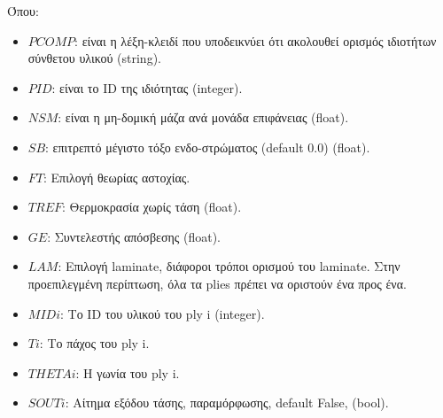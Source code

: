 \begin{table}[h]
  \centering
  \caption{H \textlatin{bulk data entry} κάρτα \textlatin{PCOMP} του \textlatin{Optistruct}}
  \label{tab:OptistructPCOMPcard}
\end{table}


Όπου:

\begin{itemize}
  \item
    $PCOMP$: είναι η λέξη-κλειδί που υποδεικνύει ότι ακολουθεί ορισμός ιδιοτήτων σύνθετου υλικού \textlatin{(string)}.
  \item
    $PID$: είναι το ID της ιδιότητας \textlatin{(integer)}.
  \item
    $NSM$: είναι η μη-δομική μάζα ανά μονάδα επιφάνειας \textlatin{(float)}.
  \item
    $SB$: επιτρεπτό μέγιστο τόξο ενδο-στρώματος \textlatin{(default 0.0) (float)}.
  \item
    $FT$: Επιλογή θεωρίας αστοχίας.
  \item
    $TREF$: Θερμοκρασία χωρίς τάση \textlatin{(float)}.
  \item
    $GE$: Συντελεστής απόσβεσης \textlatin{(float)}.
  \item
    $LAM$: Επιλογή \textlatin{laminate}, διάφοροι τρόποι ορισμού του \textlatin{laminate}. Στην προεπιλεγμένη περίπτωση, όλα τα \textlatin{plies} πρέπει να οριστούν ένα προς ένα.
  \item
    $MIDi$: Το \textlatin{ID} του υλικού του \textlatin{ply i} \textlatin{(integer)}.
  \item
    $Ti$: Το πάχος του \textlatin{ply i}.
  \item
    $THETAi$: Η γωνία του \textlatin{ply i}.
  \item
    $SOUTi$: Αίτημα εξόδου τάσης, παραμόρφωσης, \textlatin{default False, (bool)}.
\end{itemize}
  

